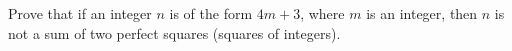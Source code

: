 Prove that if an integer $n$ is of the form $4m+3$, where $m$ is an integer, then $n$ is not a sum of two perfect squares (squares of integers).
